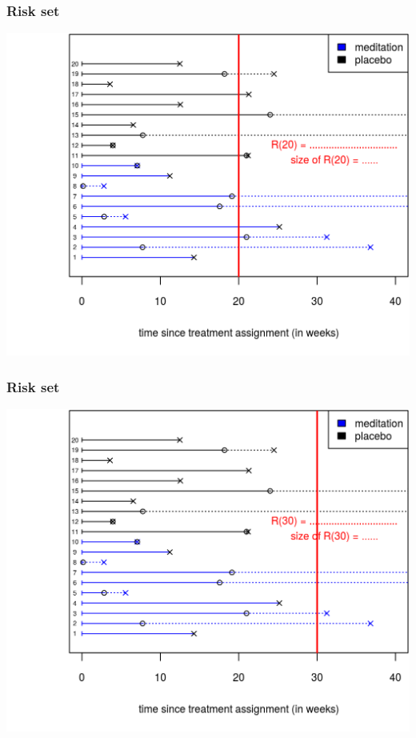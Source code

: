 \documentclass[10pt,t]{beamer}
\begin{document}
\begin{frame}
\frametitle{Risk set}
\begin{center}
\includegraphics[height=0.8\textheight]{figs/risk_set_movie_5.png}
\end{center}
\end{frame}

\begin{frame}
\frametitle{Risk set}
\begin{center}
\includegraphics[height=0.8\textheight]{figs/risk_set_movie_6.png}
\end{center}
\end{frame}
\end{document}
